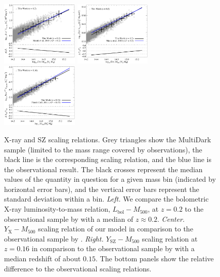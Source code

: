 \documentclass[traditabstract]{aa}
\newcommand{\rmn}{\mathrm}
\begin{document}
\begin{figure}[t]
\centering
\includegraphics[width=0.33\textwidth]{figures/lx_m.eps}
\includegraphics[width=0.33\textwidth]{figures/yx_m.eps}
\includegraphics[width=0.33\textwidth]{figures/sz_m.eps}
\caption{X-ray and SZ scaling relations. Grey triangles show the MultiDark
  sample (limited to the mass range covered by observations), the black line is
  the corresponding scaling relation, and the blue line is the
  observational result. The black crosses represent the median values of the
  quantity in question for a given mass bin (indicated by horizontal error
  bars), and the vertical error bars represent the standard deviation within a
  bin.  \emph{Left.} We compare the bolometric X-ray luminosity-to-mass
  relation, $L_{\rmn{bol}}-M_{500}$, at $z=0.2$ to the observational sample by
  \cite{2010MNRAS.406.1773M} with a median of $z \approx 0.2$. \emph{Center.}
  $Y_{\rmn{X}}-M_{500}$ scaling relation of our model in comparison to the
  observational sample by \cite{2010MNRAS.406.1773M}. \emph{Right.}
  $Y_{\rmn{SZ}}-M_{500}$ scaling relation at $z=0.16$ in comparison
  to the observational sample by \cite{2011A&A...536A..11P} with a median
  redshift of about $0.15$. The bottom panels show the relative difference to
  the observational scaling relations. 
  }
\label{fig:X_LM}
\end{figure}
\end{document}
